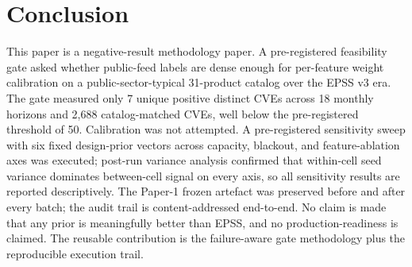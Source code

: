 \section{Conclusion}
This paper is a negative-result methodology paper. A pre-registered feasibility gate asked whether public-feed labels are dense enough for per-feature weight calibration on a public-sector-typical 31-product catalog over the EPSS v3 era. The gate measured only 7 unique positive distinct CVEs across 18 monthly horizons and 2,688 catalog-matched CVEs, well below the pre-registered threshold of 50. Calibration was not attempted. A pre-registered sensitivity sweep with six fixed design-prior vectors across capacity, blackout, and feature-ablation axes was executed; post-run variance analysis confirmed that within-cell seed variance dominates between-cell signal on every axis, so all sensitivity results are reported descriptively. The Paper-1 frozen artefact was preserved before and after every batch; the audit trail is content-addressed end-to-end. No claim is made that any prior is meaningfully better than EPSS, and no production-readiness is claimed. The reusable contribution is the failure-aware gate methodology plus the reproducible execution trail.
